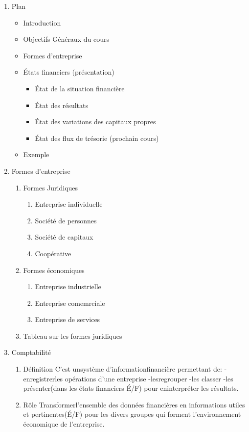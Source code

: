 \documentclass[11pt]{article}
\begin{document}
\begin{enumerate}
\item Plan
\label{sec:org73eb49f}
\begin{itemize}
\item Introduction
\item Objectifs Généraux du cours
\item Formes d'entreprise
\item États financiers (présentation)
\begin{itemize}
\item État de la situation financière
\item État des résultats
\item État des variations des capitaux propres
\item État des flux de trésorie (prochain cours)
\end{itemize}
\item Exemple
\end{itemize}

\item Formes d'entreprise
\label{sec:org8defaa8}
\begin{enumerate}
\item Formes Juridiques
\label{sec:orgebb207c}
\begin{enumerate}
\item Entreprise individuelle
\label{sec:org7c85729}
\item Société de personnes
\label{sec:org1d0d76f}
\item Société de capitaux
\label{sec:org4bdeb66}
\item Coopérative
\label{sec:org946ac37}
\end{enumerate}
\item Formes économiques
\label{sec:org3e1817e}
\begin{enumerate}
\item Entreprise industrielle
\label{sec:org1906190}
\item Entreprise comemrciale
\label{sec:orgb7e669f}
\item Entreprise de services
\label{sec:org4138b29}
\end{enumerate}

\item Tableau sur les formes juridiques
\label{sec:org2f56567}
\end{enumerate}

\item Comptabilité
\label{sec:org77ab94d}
\begin{enumerate}
\item Définition
\label{sec:orgda8006c}
C’est unsystème d’informationfinancière permettant de:
-enregistrerles opérations d’une entreprise
-lesregrouper
-les classer
-les présenter(dans les états financiers É/F) pour eninterpréter les résultats.
\item Rôle
\label{sec:org354b2db}
Transformerl’ensemble des données financières en informations utiles et
pertinentes(É/F) pour les divers groupes qui forment l’environnement économique
de l’entreprise.


\end{enumerate}
\end{enumerate}
\end{document}
